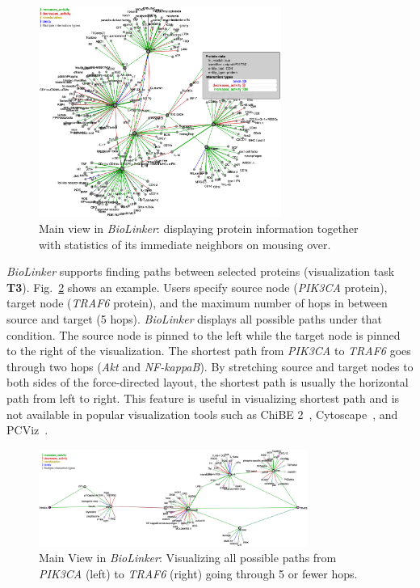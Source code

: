 \documentclass[journal]{vgtc}                %
\newcommand{\theName}{\textit{BioLinker}}
\begin{document}
\begin{figure}[h!]
  \centering
  \includegraphics[width=225pt]{figures/Figure3.png}
  \caption{Main view in \theName{}: displaying protein information together with statistics of its immediate neighbors on mousing over.}
  \label{fig:Figure3}
\end{figure}

\theName{} supports finding paths between selected proteins (visualization task \textbf{T3}). Fig.~\ref{fig:Figure4} shows an example. Users specify source node (\textit{PIK3CA} protein), target node (\textit{TRAF6} protein), and the maximum number of hops in between source and target (5 hops). \theName{} displays all possible paths under that condition. The source node is pinned to the left while the target node is pinned to the right of the visualization. The shortest path from \textit{PIK3CA} to \textit{TRAF6} goes through two hops (\textit{Akt} and \textit{NF-kappaB}). By stretching source and target nodes to both sides of the force-directed layout, the shortest path is usually the horizontal path from left to right. This feature is useful in visualizing shortest path and is not available in popular visualization tools such as ChiBE 2~\cite{ChiBE2_2014}, Cytoscape~\cite{shannon2003cytoscape}, and PCViz~\cite{cerami2011pathway}. 

\begin{figure}[h!]
  \centering
  \includegraphics[width=250pt]{figures/Figure4.png}
  \caption{ Main View in \theName{}: Visualizing all possible paths from \textit{PIK3CA} (left) to \textit{TRAF6} (right) going through 5 or fewer hops.}
  \label{fig:Figure4}
\end{figure}
\end{document}
